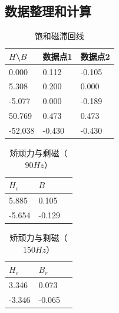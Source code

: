 \documentclass[zihao=5, UTF8]{article}
\theoremstyle{MyLineTheoremStyle} %
\theoremstyle{MyBlockTheoremStyle} %
\theoremstyle{MySubsubsectionStyle} %
\begin{document}
\subsection{数据整理和计算}

\begin{table}[ht]
  \centering
  \caption{饱和磁滞回线}\label{饱和磁滞回线}
  \begin{tabularx}{\textwidth}{|X|X|X|}
    \hline
    $H$\textbackslash$B$ & 数据点1 & 数据点2 \\
    \hline
    0.000 & 0.112 & -0.105 \\
    \hline
    5.308 & 0.200 & 0.000 \\
    \hline
    -5.077 & 0.000 & -0.189 \\
    \hline
    50.769 & 0.473 & 0.473 \\
    \hline
    -52.038 & -0.430 & -0.430 \\
    \hline
  \end{tabularx}
\end{table}

\begin{table}[ht]
  \centering
  \caption{矫顽力与剩磁（$90Hz$）}\label{矫顽力与剩磁（$90Hz$）}
  \begin{tabularx}{\textwidth}{|X|X|X|}
  \hline
  $H_c$ & $B$ \\
  \hline
  5.885 & 0.105 \\
  \hline
  -5.654 & -0.129 \\
  \hline
  \end{tabularx}

\end{table}

\begin{table}[ht]
  \centering
  \caption{矫顽力与剩磁（$150Hz$）}\label{矫顽力与剩磁（$150Hz$）}
  \begin{tabularx}{\textwidth}{|X|X|X|}
  \hline
  $H_c$ & $B_r$ \\
  \hline
  3.346 & 0.073 \\
  \hline
  -3.346 & -0.065 \\
  \hline
\end{tabularx}
\end{table}
\end{document}
